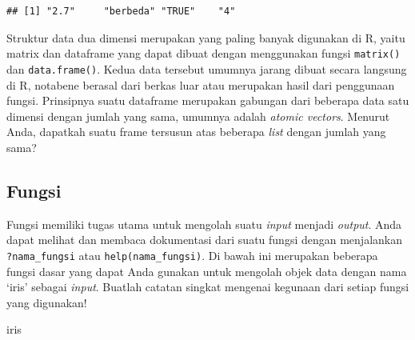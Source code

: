 \documentclass[]{article}
\newenvironment{Shaded}{\begin{snugshade}}{\end{snugshade}}
\newcommand{\NormalTok}[1]{#1}
\begin{document}
\begin{verbatim}
## [1] "2.7"     "berbeda" "TRUE"    "4"
\end{verbatim}

Struktur data dua dimensi merupakan yang paling banyak digunakan di R,
yaitu matrix dan dataframe yang dapat dibuat dengan menggunakan fungsi
\texttt{matrix()} dan \texttt{data.frame()}. Kedua data tersebut umumnya
jarang dibuat secara langsung di R, notabene berasal dari berkas luar
atau merupakan hasil dari penggunaan fungsi. Prinsipnya suatu dataframe
merupakan gabungan dari beberapa data satu dimensi dengan jumlah yang
sama, umumnya adalah \emph{atomic vectors}. Menurut Anda, dapatkah suatu
frame tersusun atas beberapa \emph{list} dengan jumlah yang sama?

\hypertarget{fungsi}{%
\subsection{Fungsi}\label{fungsi}}

Fungsi memiliki tugas utama untuk mengolah suatu \emph{input} menjadi
\emph{output}. Anda dapat melihat dan membaca dokumentasi dari suatu
fungsi dengan menjalankan \texttt{?nama\_fungsi} atau
\texttt{help(nama\_fungsi)}. Di bawah ini merupakan beberapa fungsi
dasar yang dapat Anda gunakan untuk mengolah objek data dengan nama
`iris' sebagai \emph{input}. Buatlah catatan singkat mengenai kegunaan
dari setiap fungsi yang digunakan!

\begin{Shaded}
\begin{Highlighting}[]
\NormalTok{iris}
\end{Highlighting}
\end{Shaded}
\end{document}
